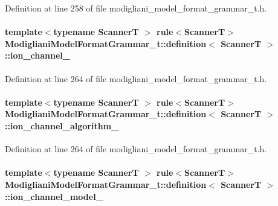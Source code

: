 Definition at line 258 of file modigliani\_\-model\_\-format\_\-grammar\_\-t.h.

\paragraph[{ion\_\-channel\_\-}]{\setlength{\rightskip}{0pt plus 5cm}template$<$typename ScannerT $>$ rule$<$ScannerT$>$ {\bf ModiglianiModelFormatGrammar\_\-t::definition}$<$ ScannerT $>$::{\bf ion\_\-channel\_\-}}\hfill\label{struct_modigliani_model_format_grammar__t_1_1definition_a0464213d954cc58af82536dd2cb07e32}


Definition at line 264 of file modigliani\_\-model\_\-format\_\-grammar\_\-t.h.

\paragraph[{ion\_\-channel\_\-algorithm\_\-}]{\setlength{\rightskip}{0pt plus 5cm}template$<$typename ScannerT $>$ rule$<$ScannerT$>$ {\bf ModiglianiModelFormatGrammar\_\-t::definition}$<$ ScannerT $>$::{\bf ion\_\-channel\_\-algorithm\_\-}}\hfill\label{struct_modigliani_model_format_grammar__t_1_1definition_a90123f5751ffb371f75920097a436502}


Definition at line 264 of file modigliani\_\-model\_\-format\_\-grammar\_\-t.h.

\paragraph[{ion\_\-channel\_\-model\_\-}]{\setlength{\rightskip}{0pt plus 5cm}template$<$typename ScannerT $>$ rule$<$ScannerT$>$ {\bf ModiglianiModelFormatGrammar\_\-t::definition}$<$ ScannerT $>$::{\bf ion\_\-channel\_\-model\_\-}}\hfill\label{struct_modigliani_model_format_grammar__t_1_1definition_afa6a1fb337d41f29eaf6c0e6f3f56c7e}


